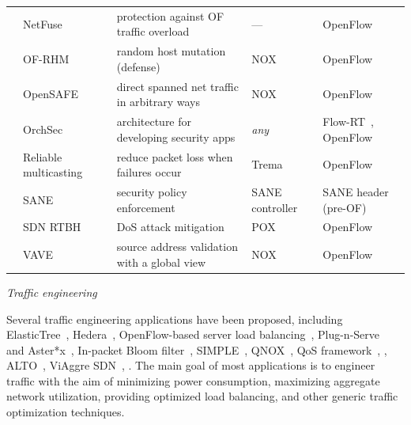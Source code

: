 {\begin{table}[!htp]
\begin{center}
\begin{tabularx}{\linewidth}{p{2cm}p{3.2cm}p{5.1cm}Xp{3.3cm}}
& NetFuse~\cite{wang2013} & protection against OF traffic overload & --- & OpenFlow \\
& OF-RHM~\cite{jafarian2012}    & random host mutation (defense) &  NOX & OpenFlow      \\
& OpenSAFE~\cite{ballard2010} & direct spanned net traffic in arbitrary ways & NOX & OpenFlow \\

& OrchSec~\cite{zaalouk2014} & architecture for developing security apps & \textit{any} & Flow-RT~\cite{sflowrt2014}, OpenFlow\\

& Reliable multicasting~\cite{kotani2012} & reduce packet loss when failures occur & Trema & OpenFlow \\
& SANE~\cite{casado2006}       & security policy enforcement         &  SANE controller & SANE header (pre-OF) \\

& {SDN RTBH~\cite{Giotis2014}} & {DoS attack mitigation} & {POX} & {OpenFlow}\\

& VAVE~\cite{yao2011} & source address validation with a global view & NOX & OpenFlow \\

\hline
\end{tabularx}
\end{center}
\end{table}
}

\vspace{2mm}
\noindent \textit{Traffic engineering}

Several traffic engineering applications have been proposed, including 
ElasticTree~\cite{heller2010}, Hedera~\cite{al-fares2010},
OpenFlow-based server load balancing~\cite{wang2011},
Plug-n-Serve~\cite{handigol2009-1} and Aster*x~\cite{handigol2009},
In-packet Bloom filter~\cite{macapuna2010},
SIMPLE~\cite{qazi2013-1}, QNOX~\cite{jeong2012}, QoS framework~\cite{kim2010}, 
, 
ALTO~\cite{scharf2013}, ViAggre SDN~\cite{skoldstrom2013-1},
.
The main goal of most applications is to engineer traffic with the aim of minimizing power consumption, maximizing aggregate network utilization, providing optimized load balancing, and other generic traffic optimization techniques.

